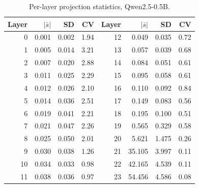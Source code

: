 
\begin{table}[t]
  \centering
  \small
  \caption{Per-layer projection statistics, Qwen2.5-0.5B.}
  \label{tab:cv_qwen0_5b}
  \begin{tabular}{rrrr@{\hskip 2em}rrrr}
    \toprule
    Layer & $|\bar s|$ & SD & CV & Layer & $|\bar s|$ & SD & CV \\
    \midrule
    0 & 0.001 & 0.002 & 1.94 & 12 & 0.049 & 0.035 & 0.72 \\
    1 & 0.005 & 0.014 & 3.21 & 13 & 0.057 & 0.039 & 0.68 \\
    2 & 0.007 & 0.020 & 2.88 & 14 & 0.084 & 0.051 & 0.61 \\
    3 & 0.011 & 0.025 & 2.29 & 15 & 0.095 & 0.058 & 0.61 \\
    4 & 0.012 & 0.026 & 2.10 & 16 & 0.110 & 0.092 & 0.84 \\
    5 & 0.014 & 0.036 & 2.51 & 17 & 0.149 & 0.083 & 0.56 \\
    6 & 0.019 & 0.041 & 2.21 & 18 & 0.195 & 0.100 & 0.51 \\
    7 & 0.021 & 0.047 & 2.26 & 19 & 0.565 & 0.329 & 0.58 \\
    8 & 0.025 & 0.050 & 2.01 & 20 & 5.621 & 1.475 & 0.26 \\
    9 & 0.030 & 0.038 & 1.26 & 21 & 35.105 & 3.997 & 0.11 \\
    10 & 0.034 & 0.033 & 0.98 & 22 & 42.165 & 4.539 & 0.11 \\
    11 & 0.038 & 0.036 & 0.97 & 23 & 54.456 & 4.586 & 0.08 \\
    \bottomrule
  \end{tabular}
\end{table}

